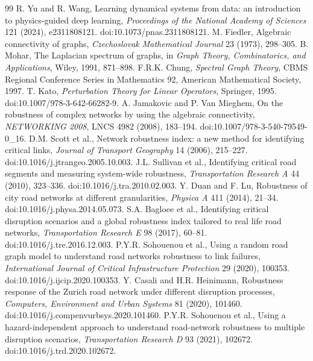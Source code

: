 \documentclass[11pt]{article}
\begin{document}
\begin{thebibliography}{99}
 R. Yu and R. Wang, Learning dynamical systems from data:
an introduction to physics-guided deep learning,
\emph{Proceedings of the National Academy of Sciences} 121 (2024), e2311808121.
doi:10.1073/pnas.2311808121.
 M. Fiedler, Algebraic connectivity of graphs,
\emph{Czechoslovak Mathematical Journal} 23 (1973), 298--305.
 B. Mohar, The Laplacian spectrum of graphs, in
\emph{Graph Theory, Combinatorics, and Applications}, Wiley, 1991, 871--898.
 F.R.K. Chung, \emph{Spectral Graph Theory}, CBMS Regional
Conference Series in Mathematics 92, American Mathematical Society, 1997.
 T. Kato, \emph{Perturbation Theory for Linear Operators},
Springer, 1995. doi:10.1007/978-3-642-66282-9.
 A. Jamakovic and P. Van Mieghem, On the robustness of
complex networks by using the algebraic connectivity, \emph{NETWORKING 2008},
LNCS 4982 (2008), 183--194. doi:10.1007/978-3-540-79549-0\_16.
 D.M. Scott et al., Network robustness index: a new method
for identifying critical links, \emph{Journal of Transport Geography} 14
(2006), 215--227. doi:10.1016/j.jtrangeo.2005.10.003.
 J.L. Sullivan et al., Identifying critical road segments
and measuring system-wide robustness, \emph{Transportation Research A} 44
(2010), 323--336. doi:10.1016/j.tra.2010.02.003.
 Y. Duan and F. Lu, Robustness of city road networks at
different granularities, \emph{Physica A} 411 (2014), 21--34.
doi:10.1016/j.physa.2014.05.073.
 S.A. Bagloee et al., Identifying critical disruption
scenarios and a global robustness index tailored to real life road networks,
\emph{Transportation Research E} 98 (2017), 60--81.
doi:10.1016/j.tre.2016.12.003.
 P.Y.R. Sohouenou et al., Using a random road graph
model to understand road networks robustness to link failures,
\emph{International Journal of Critical Infrastructure Protection} 29 (2020),
100353. doi:10.1016/j.ijcip.2020.100353.
 Y. Casali and H.R. Heinimann, Robustness response of the
Zurich road network under different disruption processes, \emph{Computers,
Environment and Urban Systems} 81 (2020), 101460.
doi:10.1016/j.compenvurbsys.2020.101460.
 P.Y.R. Sohouenou et al., Using a hazard-independent
approach to understand road-network robustness to multiple disruption scenarios,
\emph{Transportation Research D} 93 (2021), 102672.
doi:10.1016/j.trd.2020.102672.

\end{thebibliography}
\end{document}
